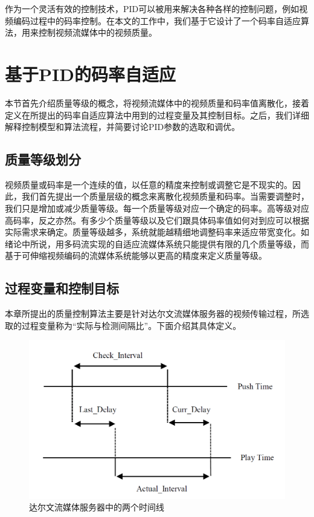 作为一个灵活有效的控制技术，PID可以被用来解决各种各样的控制问题，例如视频编码过程中的码率控制\supercite{Li1999,Wong2004,Shen2009,Yang2010,Zhou2011}。在本文的工作中，我们基于它设计了一个码率自适应算法，用来控制视频流媒体中的视频质量。

\section{基于PID的码率自适应}

本节首先介绍质量等级的概念，将视频流媒体中的视频质量和码率值离散化，接着定义在所提出的码率自适应算法中用到的过程变量及其控制目标。之后，我们详细解释控制模型和算法流程，并简要讨论PID参数的选取和调优。

\subsection{质量等级划分}

视频质量或码率是一个连续的值，以任意的精度来控制或调整它是不现实的。因此，我们首先提出一个质量层级的概念来离散化视频质量和码率。当需要调整时，我们只是增加或减少质量等级。每一个质量等级对应一个确定的码率。高等级对应高码率，反之亦然。有多少个质量等级以及它们跟具体码率值如何对到应可以根据实际需求来确定。质量等级越多，系统就能越精细地调整码率来适应带宽变化。如绪论中所说，用多码流实现的自适应流媒体系统只能提供有限的几个质量等级，而基于可伸缩视频编码的流媒体系统能够以更高的精度来定义质量等级。

\subsection{过程变量和控制目标}

本章所提出的质量控制算法主要是针对达尔文流媒体服务器的视频传输过程，所选取的过程变量称为“实际与检测间隔比”。下面介绍其具体定义。

\begin{figure}[t]
	\centering
	\includegraphics[width = 0.6\linewidth]{figures/intervals.png}
	\caption{达尔文流媒体服务器中的两个时间线 \label{fig:intervals}}
\end{figure}

